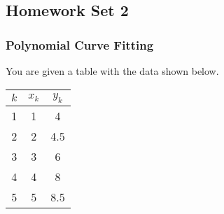 \documentclass[11pt]{article} %
\begin{document}
\subsection{Homework Set 2}

\subsubsection{Polynomial Curve Fitting}

You are given a table with the data shown below.

\begin{center}
\begin{tabular}{c c c}
\hline
$k$ & $x_k$ & $y_k$ \\
\hline
1 & 1 & 4 \\
2 & 2 & 4.5 \\
3 & 3 & 6 \\
4 & 4 & 8 \\
5 & 5 & 8.5 \\
\hline
\end{tabular}
\end{center}
\end{document}

